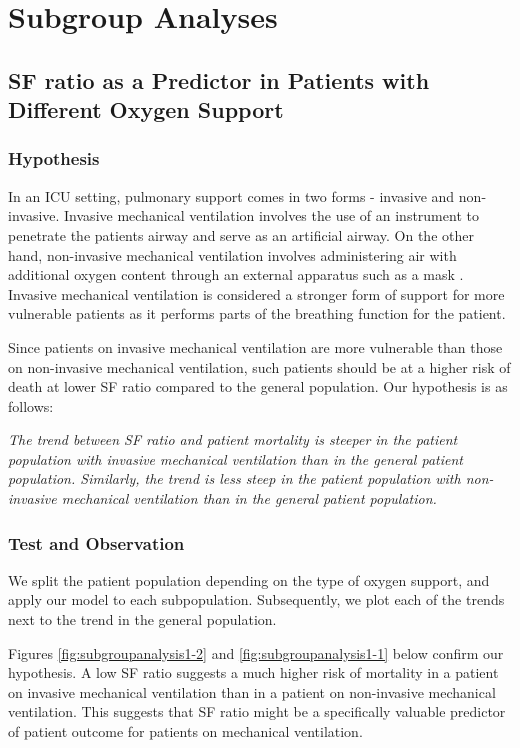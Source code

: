 \section{Subgroup Analyses}

\subsection{SF ratio as a Predictor in Patients with Different Oxygen Support}

\subsubsection{Hypothesis}
In an ICU setting, pulmonary support comes in two forms - invasive and non-invasive. Invasive mechanical ventilation involves the use of an instrument to penetrate the patients airway and serve as an artificial airway. On the other hand, non-invasive mechanical ventilation involves administering air with additional oxygen content through an external apparatus such as a mask \citep{davidson2016bts}. Invasive mechanical ventilation is considered a stronger form of support for more vulnerable patients as it performs parts of the breathing function for the patient. 

Since patients on invasive mechanical ventilation are more vulnerable than those on non-invasive mechanical ventilation, such patients should be at a higher risk of death at lower SF ratio compared to the general population. Our hypothesis is as follows: 

\textit{The trend between SF ratio and patient mortality is steeper in the patient population with invasive mechanical ventilation than in the general patient population. Similarly, the trend is less steep in the patient population with non-invasive mechanical ventilation than in the general patient population.
}


\subsubsection{Test and Observation}

We split the patient population depending on the type of oxygen support, and apply our model to each subpopulation. Subsequently, we plot each of the trends next to the trend in the general population. 

Figures \ref{fig:subgroupanalysis1-2} and \ref{fig:subgroupanalysis1-1} below confirm our hypothesis. A low SF ratio suggests a much higher risk of mortality in a patient on invasive mechanical ventilation than in a patient on non-invasive mechanical ventilation.  This suggests that SF ratio might be a specifically valuable predictor of patient outcome for patients on mechanical ventilation. 

